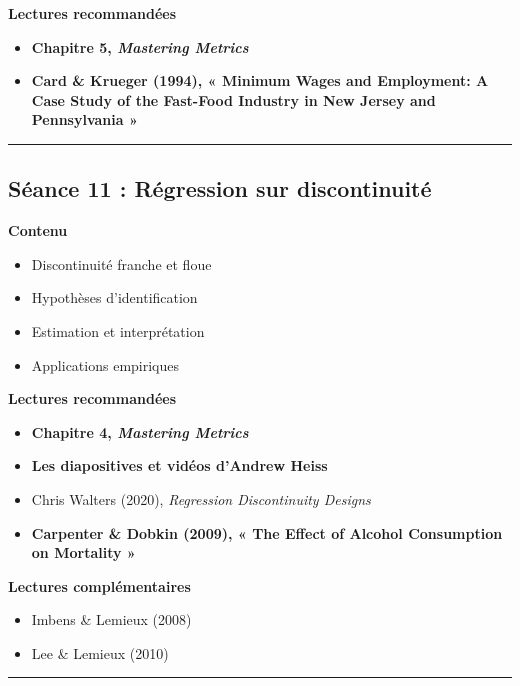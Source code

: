 \documentclass[
  11pt,
]{article}
\providecommand{\tightlist}{%
  \setlength{\itemsep}{0pt}\setlength{\parskip}{0pt}}
\begin{document}
\textbf{Lectures recommandées}

\begin{itemize}
\tightlist
\item
  \textbf{Chapitre 5, \emph{Mastering Metrics}}
\item
  \textbf{Card \& Krueger (1994), « Minimum Wages and Employment: A Case
  Study of the Fast-Food Industry in New Jersey and Pennsylvania »}
\end{itemize}

\begin{center}\rule{0.5\linewidth}{0.5pt}\end{center}

\subsection{Séance 11 : Régression sur
discontinuité}\label{suxe9ance-11-ruxe9gression-sur-discontinuituxe9}

\textbf{Contenu}

\begin{itemize}
\tightlist
\item
  Discontinuité franche et floue
\item
  Hypothèses d'identification
\item
  Estimation et interprétation
\item
  Applications empiriques
\end{itemize}

\textbf{Lectures recommandées}

\begin{itemize}
\tightlist
\item
  \textbf{Chapitre 4, \emph{Mastering Metrics}}
\item
  \textbf{Les diapositives et vidéos d'Andrew Heiss}
\item
  Chris Walters (2020), \emph{Regression Discontinuity Designs}
\item
  \textbf{Carpenter \& Dobkin (2009), « The Effect of Alcohol
  Consumption on Mortality »}
\end{itemize}

\textbf{Lectures complémentaires}

\begin{itemize}
\tightlist
\item
  Imbens \& Lemieux (2008)
\item
  Lee \& Lemieux (2010)
\end{itemize}

\begin{center}\rule{0.5\linewidth}{0.5pt}\end{center}
\end{document}
